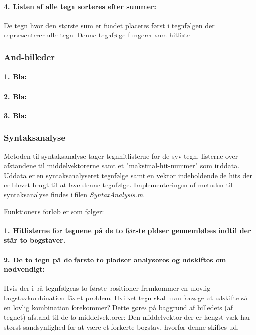 \paragraph{4. Listen af alle tegn sorteres efter summer:} De tegn hvor den største sum er fundet placeres først i tegnfølgen der repræsenterer alle tegn. Denne tegnfølge fungerer som hitliste.

\subsubsection{And-billeder}

\paragraph{1. Bla:}

\paragraph{2. Bla:}

\paragraph{3. Bla:}

\subsubsection{Syntaksanalyse}

Metoden til syntaksanalyse tager tegnhitlisterne for de syv tegn, listerne over afstandene til middelvektorerne samt et "maksimal-hit-nummer" som inddata. Uddata er en syntaksanalyseret tegnfølge samt en vektor indeholdende de hits der er blevet brugt til at lave denne tegnfølge. Implementeringen af metoden til syntaksanalyse findes i filen \textit{SyntaxAnalysis.m}.

Funktionens forløb er som følger:

\paragraph{1. Hitlisterne for tegnene på de to første pldser gennemløbes indtil der står to bogstaver.}
\paragraph{2. De to tegn på de første to pladser analyseres og udskiftes om nødvendigt:}
Hvis der i på tegnfølgens to første positioner fremkommer en ulovlig bogstavkombination fås et problem: Hvilket tegn skal man forsøge at udskifte så en lovlig kombination forekommer? Dette gøres på baggrund af billedets (af tegnet) afstand til de to middelvektorer: Den middelvektor der er længst væk har størst sandsynlighed for at være et forkerte bogstav, hvorfor denne skiftes ud.

